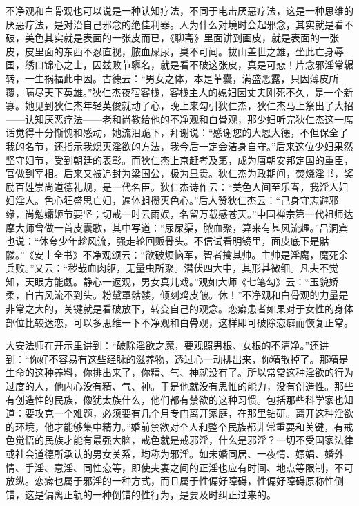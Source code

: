 不净观和白骨观也可以说是一种认知疗法，不同于电击厌恶疗法，这是一种思维的厌恶疗法，是对治自己邪念的绝佳利器。人为什么对境时会起邪念，其实就是看不破，美色其实就是表面的一张皮而已，《聊斋》里面讲到画皮，就是表面的一张皮，皮里面的东西不忍直视，脓血屎尿，臭不可闻。拔山盖世之雄，坐此亡身辱国，绣口锦心之士，因兹败节隳名，就是看不破这张皮，真是可悲！片念邪淫常辗转，一生祸福此中因。古德云：“男女之体，本是革囊，满盛恶露，只因薄皮所覆，瞒尽天下英雄。”狄仁杰夜宿客栈，客栈主人的媳妇因丈夫刚死不久，是一个新寡。她见到狄仁杰年轻英俊就动了心，晚上来勾引狄仁杰，狄仁杰马上祭出了大招——认知厌恶疗法——老和尚教给他的不净观和白骨观，那少妇听完狄仁杰这一席话觉得十分惭愧和感动，她流泪跪下，拜谢说：“感谢您的大恩大德，不但保全了我的名节，还指示我熄灭淫欲的方法，我今后一定会洁身自守。”后来这位少妇果然坚守妇节，受到朝廷的表彰。而狄仁杰上京赶考及第，成为唐朝安邦定国的重臣，官做到宰相。后来又被追封为梁国公，极为显贵。狄仁杰为政期间，焚烧淫书，奖励百姓崇尚道德礼规，是一代名臣。狄仁杰诗作云：“美色人间至乐春，我淫人妇妇淫人。色心狂盛思亡妇，遍体蛆攒灭色心。”后人赞狄仁杰云：“己身守志避邪缘，尚勉孀姬节要坚；切戒一时云雨娱，名留万载感苍天。”中国禅宗第一代祖师达摩大师曾做一首皮囊歌，其中写道：“尿屎渠，脓血聚，算来有甚风流趣。”吕洞宾也说：“休夸少年趁风流，强走轮回贩骨头。不信试看明镜里，面皮底下是骷髅。”《安士全书》不净观颂云：“欲破烦恼军，智者擒其帅。主帅是淫魔，魔死余兵败。”又云：“秽哉血肉躯，无量虫所聚。潜伏四大中，其形甚微细。凡夫不觉知，天眼方能觑。静心一返观，男女真儿戏。”观如大师《七笔勾》云：“玉貌娇柔，自古风流不到头。粉黛罩骷髅，倾刻鸡皮皱。休！”不净观和白骨观的力量是非常之大的，关键就是看破放下，转变自己的观念。恋癖患者如果对于女性的身体部位比较迷恋，可以多思维一下不净观和白骨观，这样即可破除恋癖而恢复正常。

大安法师在开示里讲到：“破除淫欲之魔，要观照男根、女根的不清净。”还讲到：“你好不容易有这些经脉的滋养物，透过心一动排出来，你精散掉了。那精是生命的这种养料，你排出来了，你精、气、神就没有了。所以常常这种淫欲的行为过度的人，他内心没有精、气、神。于是他就没有思惟的能力，没有创造性。那些有创造性的民族，像犹太族什么，他们都有禁欲的这种习惯。包括那些科学家也知道：要攻克一个难题，必须要有几个月专门离开家庭，在那里钻研。离开这种淫欲的环境，他才能够集中精力。”婚前禁欲对个人和整个民族都非常重要和关键，有戒色觉悟的民族才能有最强大脑，戒色就是戒邪淫，什么是邪淫？一切不受国家法律或社会道德所承认的男女关系，均称为邪淫。如未婚同居、一夜情、嫖娼、婚外情、手淫、意淫、同性恋等，即使夫妻之间的正淫也应有时间、地点等限制，不可放纵。恋癖也属于邪淫的一种方式，而且属于性偏好障碍，性偏好障碍原称性倒错，这是偏离正轨的一种倒错的性行为，是要及时纠正过来的。

